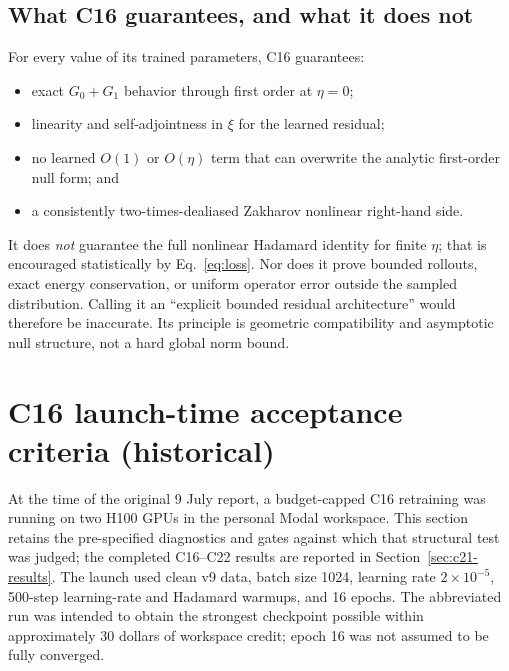 \documentclass[11pt]{article}
\begin{document}
\subsection{What C16 guarantees, and what it does not}

For every value of its trained parameters, C16 guarantees:
\begin{itemize}
  \item exact \(G_0+G_1\) behavior through first order at \(\eta=0\);
  \item linearity and self-adjointness in \(\xi\) for the learned residual;
  \item no learned \(O(1)\) or \(O(\eta)\) term that can overwrite the analytic
        first-order null form; and
  \item a consistently two-times-dealiased Zakharov nonlinear right-hand side.
\end{itemize}
It does \emph{not} guarantee the full nonlinear Hadamard identity for finite
\(\eta\); that is encouraged statistically by Eq.~\eqref{eq:loss}.  Nor does it
prove bounded rollouts, exact energy conservation, or uniform operator error
outside the sampled distribution.  Calling it an ``explicit bounded residual
architecture'' would therefore be inaccurate.  Its principle is geometric
compatibility and asymptotic null structure, not a hard global norm bound.

\section{C16 launch-time acceptance criteria (historical)}

At the time of the original 9 July report, a budget-capped C16 retraining was
running on two H100 GPUs in the personal Modal workspace.  This section retains
the pre-specified diagnostics and gates against which that structural test was
judged; the completed C16--C22 results are reported in
Section~\ref{sec:c21-results}.  The launch used clean v9 data, batch size 1024,
learning rate \(2\times10^{-5}\), 500-step learning-rate and Hadamard warmups,
and 16 epochs.  The abbreviated run was intended to obtain the strongest
checkpoint possible within approximately 30 dollars of workspace credit; epoch
16 was not assumed to be fully converged.
\end{document}
